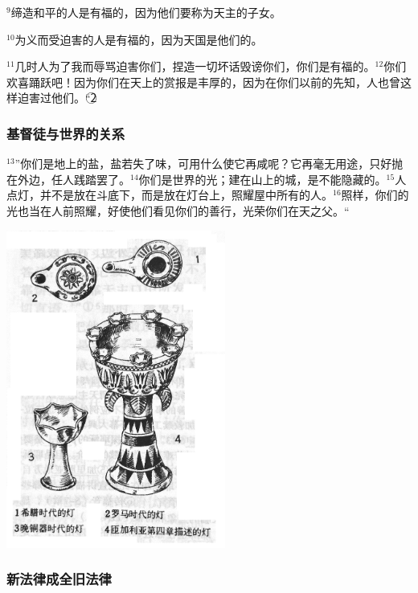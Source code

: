 $^{9}$缔造和平的人是有福的，因为他们要称为天主的子女。

$^{10}$为义而受迫害的人是有福的，因为天国是他们的。

$^{11}$几时人为了我而辱骂迫害你们，捏造一切坏话毁谤你们，你们是有福的。$^{12}$你们欢喜踊跃吧！因为你们在天上的赏报是丰厚的，因为在你们以前的先知，人也曾这样迫害过他们。“\textcircled{2}


\subsubsection{基督徒与世界的关系}
$^{13}$”你们是地上的盐，盐若失了味，可用什么使它再咸呢？它再毫无用途，只好抛在外边，任人践踏罢了。$^{14}$你们是世界的光；建在山上的城，是不能隐藏的。$^{15}$人点灯，并不是放在斗底下，而是放在灯台上，照耀屋中所有的人。$^{16}$照样，你们的光也当在人前照耀，好使他们看见你们的善行，光荣你们在天之父。“
\begin{center}
  \includegraphics[width=72mm]{images/1514.png}
\end{center}


\subsubsection{新法律成全旧法律}




